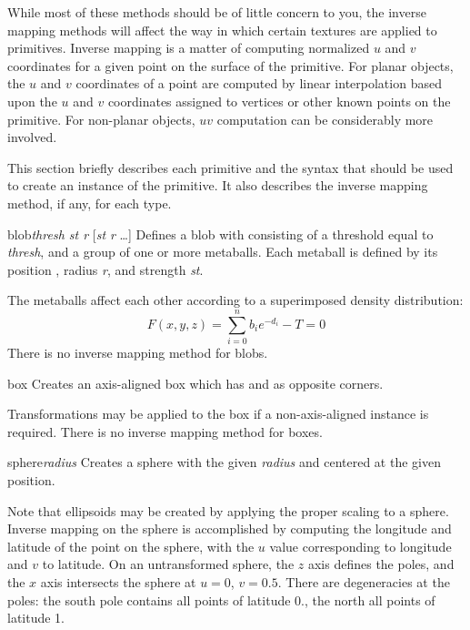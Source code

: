 While most of these methods should be of little concern to you, the
inverse mapping methods
will affect the way in which certain textures are applied to primitives.
Inverse mapping is a matter of computing normalized $u$ and $v$ coordinates
for a given point on the surface of the primitive.  For planar objects,
the $u$ and $v$ coordinates of a point are computed
by linear interpolation based upon the $u$ and $v$ coordinates assigned
to vertices or other known points on the primitive.  For non-planar
objects, $uv$ computation can be considerably more involved.

This section briefly describes each primitive and
the syntax that should be used to create an instance of the primitive.
It also describes the inverse mapping method, if any, for each type.

\begin{defprim}{blob}{{\em thresh st r}  [{\em st r}  \ldots]}
	Defines a blob with consisting of a threshold equal to {\em thresh},
	and a
	group of one or more metaballs.  Each metaball is defined by 
	its position , radius {\em r}, and strength {\em st}.
\end{defprim}
The metaballs affect each other according to a superimposed
density distribution:
\[
F(x,y,z) = \sum_{i=0}^n b_{i}e^{-d_{i}} - T = 0
\]
There is no inverse mapping method for blobs.

\begin{defprim}{box}{ }
	Creates an axis-aligned box
	which has  and  as
	opposite corners.
\end{defprim}
Transformations may be applied to the box if a non-axis-aligned instance
is required.  There is no inverse mapping method for boxes.

\begin{defprim}{sphere}{{\em radius} }
	Creates a sphere with the given {\em radius} and centered at the
	given position.
\end{defprim}
Note that ellipsoids may be created by applying the proper scaling
to a sphere.  Inverse mapping on the sphere is accomplished
by computing the longitude and latitude of the point on the sphere,
with the $u$ value corresponding to longitude and $v$ to latitude.
On an untransformed sphere, the $z$ axis defines the poles, and the
$x$ axis intersects the sphere at $u = 0$, $v = 0.5$.  There are
degeneracies at the poles: the south pole contains all points of
latitude 0., the north all points of latitude 1.

